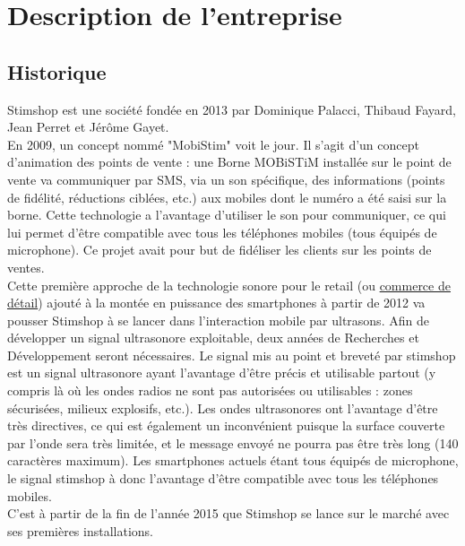 \documentclass[12pt]{report}
\begin{document}
\chapter{Description de l'entreprise}

	\section{Historique}
	
Stimshop est une société fondée en 2013 par Dominique Palacci, Thibaud Fayard, Jean Perret et Jérôme Gayet.\\

En 2009, un concept nommé "MobiStim" voit le jour. Il s'agit d'un concept d'animation des points de vente : une Borne MOBiSTiM installée sur le point de vente va communiquer par SMS, via un son spécifique, des informations (points de fidélité, réductions ciblées, etc.) aux mobiles dont le numéro a été saisi sur la borne. Cette technologie a l'avantage d'utiliser le son pour communiquer, ce qui lui permet d'être compatible avec tous les téléphones mobiles (tous équipés de microphone). Ce projet avait pour but de fidéliser les clients sur les points de ventes. \\
 
Cette première approche de la technologie sonore pour le retail (ou \href{https://www.insee.fr/fr/metadonnees/definition/c1647}{commerce de détail}) ajouté à la montée en puissance des smartphones à partir de 2012 va pousser Stimshop à se lancer dans l'interaction mobile par ultrasons. Afin de développer un signal ultrasonore exploitable, deux années de Recherches et Développement seront nécessaires. Le signal mis au point et breveté par stimshop est un signal ultrasonore ayant l'avantage d'être précis et utilisable partout (y compris là où les ondes radios ne sont pas autorisées ou utilisables : zones sécurisées, milieux explosifs, etc.). Les ondes ultrasonores ont l'avantage d'être très directives, ce qui est également un inconvénient puisque la surface couverte par l'onde sera très limitée, et le message envoyé ne pourra pas être très long (140 caractères maximum). Les smartphones actuels étant tous équipés de microphone, le signal stimshop à donc l'avantage d'être compatible avec tous les téléphones mobiles. \\

C'est à partir de la fin de l'année 2015 que Stimshop se lance sur le marché avec ses premières installations.\\ 
\end{document}
